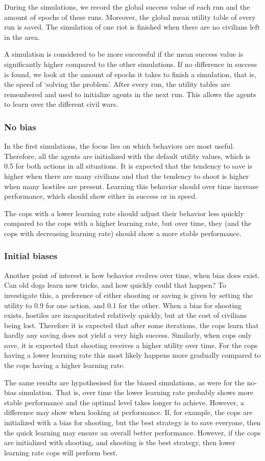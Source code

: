 During the simulations, we record the global success value of each run and the amount of epochs of these runs.
Moreover, the global mean utility table of every run is saved.
The simulation of one riot is finished when there are no civilians left in the area.

A simulation is considered to be more successful if the mean success value is significantly higher compared to the other simulations.
If no difference in success is found, we look at the amount of epochs it takes to finish a simulation, that is, the speed of `solving the problem'.
After every run, the utility tables are remembered and used to initialize agents in the next run.
This allows the agents to learn over the different civil wars.

\subsubsection{No bias}
In the first simulations, the focus lies on which behaviors are most useful.
Therefore, all the agents are initialized with the default utility values, which is 0.5 for both actions in all situations.
It is expected that the tendency to save is higher when there are many civilians and that the tendency to shoot is higher when many hostiles are present.
Learning this behavior should over time increase performance, which should show either in success or in speed.

The cops with a lower learning rate should adjust their behavior less quickly compared to the cops with a higher learning rate, but over time, they (and the cops with decreasing learning rate) should show a more stable performance.

\subsubsection{Initial biases}
Another point of interest is how behavior evolves over time, when bias does exist.
Can old dogs learn new tricks, and how quickly could that happen?
To investigate this, a preference of either shooting or saving is given by setting the utility to 0.9 for one action, and 0.1 for the other.
When a bias for shooting exists, hostiles are incapacitated relatively quickly, but at the cost of civilians being lost.
Therefore it is expected that after some iterations, the cops learn that hardly any saving does not yield a very high success.
Similarly, when cops only save, it is expected that shooting receives a higher utility over time.
For the cops having a lower learning rate this most likely happens more gradually compared to the cops having a higher learning rate.

The same results are hypothesised for the biased simulations, as were for the no-bias simulation.
That is, over time the lower learning rate probably shows more stable performance and the optimal level takes longer to achieve.
However, a difference may show when looking at performance.
If, for example, the cops are initialized with a bias for shooting, but the best strategy is to save everyone, then the quick learning may ensure an overall better performance.
However, if the cops are initialized with shooting, and shooting is the best strategy, then lower learning rate cops will perform best.

